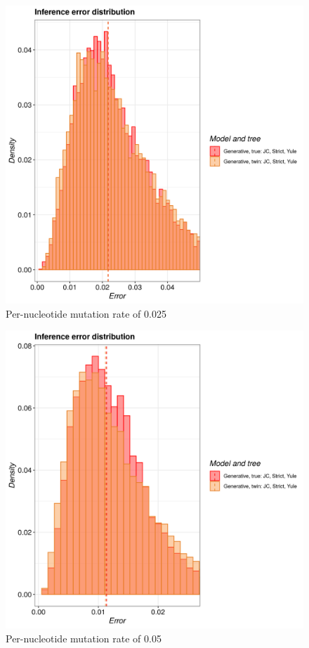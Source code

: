 \begin{figure}[H]
  \includegraphics[width=\textwidth]{pirouette_example_24/example_24_315/errors.png}
  \caption{Per-nucleotide mutation rate of 0.025}
\end{figure}

\begin{figure}[H]
  \includegraphics[width=\textwidth]{pirouette_example_24/example_24_316/errors.png}
  \caption{Per-nucleotide mutation rate of 0.05}
\end{figure}


